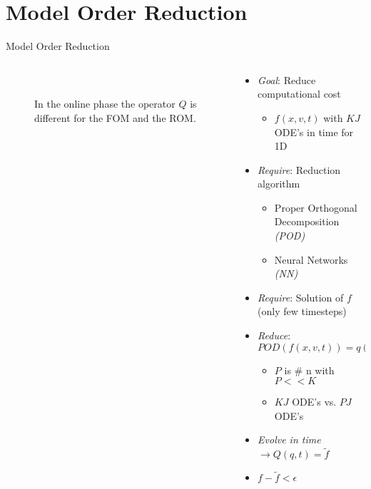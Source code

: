 \documentclass[usenames,dvipsnames,Nike,mathserif]{tuberlinbeamer}
\begin{document}
\section{Model Order Reduction}
\begin{frame}[fragile]{Model Order Reduction}
	\begin{columns}
		\begin{column}{.5\textwidth}
			\begin{figure}
				\\
				\caption{In the online phase the operator $Q$ is different for the FOM and the ROM.}
			\end{figure}
		\end{column}
		\begin{column}{.5\textwidth}
			\begin{itemize}
				\item<1->\emph{Goal}: Reduce computational cost
				\begin{itemize}
					\item<2->$f(x,v,t)$ with $KJ$ ODE's in time for 1D
				\end{itemize}
				\item<3-> \emph{Require}: Reduction algorithm 
				\begin{itemize}
					\item<4-> Proper Orthogonal Decomposition \emph{(POD)}
					\item<4-> Neural Networks \emph{(NN)}
				\end{itemize}
				\item<5->\emph{Require}: Solution of $f$ (only few timesteps)
				\item<6->\emph{Reduce}: $POD(f(x,v,t))=q(x,n,t)$
				\begin{itemize}
					\item<7->$P$ is \# n with $P<<K$
					\item<8->$KJ$ ODE's vs. $PJ$ ODE's
				\end{itemize}
				\item<9->\emph{Evolve in time}  $\rightarrow Q(q,t)=\tilde{f}$
				\item<10->$f-\tilde{f}<\epsilon$
			\end{itemize}
		\end{column}
	\end{columns}
\end{frame}
\end{document}
